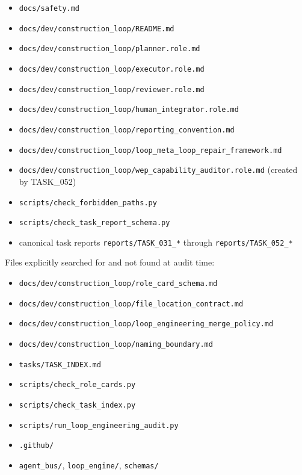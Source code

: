 \documentclass[11pt,a4paper]{article}
\begin{document}
\begin{itemize}[leftmargin=2em]
  \item \texttt{docs/safety.md}
  \item \texttt{docs/dev/construction\_loop/README.md}
  \item \texttt{docs/dev/construction\_loop/planner.role.md}
  \item \texttt{docs/dev/construction\_loop/executor.role.md}
  \item \texttt{docs/dev/construction\_loop/reviewer.role.md}
  \item \texttt{docs/dev/construction\_loop/human\_integrator.role.md}
  \item \texttt{docs/dev/construction\_loop/reporting\_convention.md}
  \item \texttt{docs/dev/construction\_loop/loop\_meta\_loop\_repair\_framework.md}
  \item \texttt{docs/dev/construction\_loop/wep\_capability\_auditor.role.md}
        (created by TASK\_052)
  \item \texttt{scripts/check\_forbidden\_paths.py}
  \item \texttt{scripts/check\_task\_report\_schema.py}
  \item canonical task reports \texttt{reports/TASK\_031\_*} through
        \texttt{reports/TASK\_052\_*}
\end{itemize}

Files explicitly searched for and not found at audit time:

\begin{itemize}[leftmargin=2em]
  \item \texttt{docs/dev/construction\_loop/role\_card\_schema.md}
  \item \texttt{docs/dev/construction\_loop/file\_location\_contract.md}
  \item \texttt{docs/dev/construction\_loop/loop\_engineering\_merge\_policy.md}
  \item \texttt{docs/dev/construction\_loop/naming\_boundary.md}
  \item \texttt{tasks/TASK\_INDEX.md}
  \item \texttt{scripts/check\_role\_cards.py}
  \item \texttt{scripts/check\_task\_index.py}
  \item \texttt{scripts/run\_loop\_engineering\_audit.py}
  \item \texttt{.github/}
  \item \texttt{agent\_bus/}, \texttt{loop\_engine/}, \texttt{schemas/}
\end{itemize}
\end{document}
